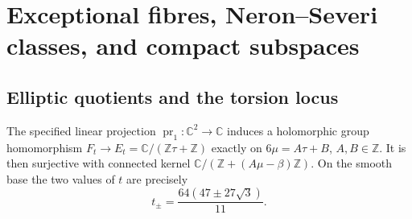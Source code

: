 \section{Exceptional fibres, Neron--Severi classes, and compact subspaces}\hypertarget{tag-01PP}{}\label{fam:section:D}
\subsection{Elliptic quotients and the torsion locus}\hypertarget{tag-01PQ}{}\label{fam:section:D.1}
\begin{proposition}\hypertarget{tag-01QR}{}\label{fam:src:D.1.1}\label{fam:st:D.1.1}

The specified linear projection \(\operatorname{pr}_1:\mathbb C^2\to
\mathbb C\) induces a holomorphic group homomorphism
\(F_t\to E_t=\mathbb C/(\mathbb Z\tau+\mathbb Z)\) exactly on
\(6\mu=A\tau+B\), \(A,B\in\mathbb Z\). It is then surjective with
connected kernel
\(\mathbb C/(\mathbb Z+(A\mu-\beta)\mathbb Z)\).
On the smooth base the two values of \(t\) are precisely
\[
 t_\pm=\frac{64(47\pm27\sqrt3)}{11}.
\]
\end{proposition}


